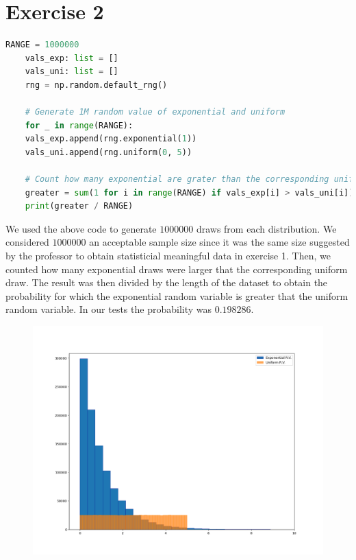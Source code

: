 \documentclass[10pt,a4paper]{article}
\begin{document}
\section*{Exercise 2}
\begin{center}
  \begin{lstlisting}[language=python]
    RANGE = 1000000
    vals_exp: list = []
    vals_uni: list = []
    rng = np.random.default_rng()
    
    # Generate 1M random value of exponential and uniform
    for _ in range(RANGE):
    vals_exp.append(rng.exponential(1))
    vals_uni.append(rng.uniform(0, 5))
    
    # Count how many exponential are grater than the corresponding uniform
    greater = sum(1 for i in range(RANGE) if vals_exp[i] > vals_uni[i])
    print(greater / RANGE)
  \end{lstlisting}
\end{center}
We used the above code to generate \(1000000\) draws from each distribution. We considered \(1000000\) an acceptable sample size since it was the same size suggested by the professor to obtain statisticial meaningful data in exercise 1.  Then, we counted how many exponential draws were larger that the corresponding uniform draw. The result was then divided by the length of the dataset to obtain the probability for which the exponential random variable is greater that the uniform random variable. In our tests the probability was \(0.198286\).

\begin{figure}[h]
  \centering
  \includegraphics[scale=0.4]{exercise-2-hist.png}
\end{figure}
\end{document}
